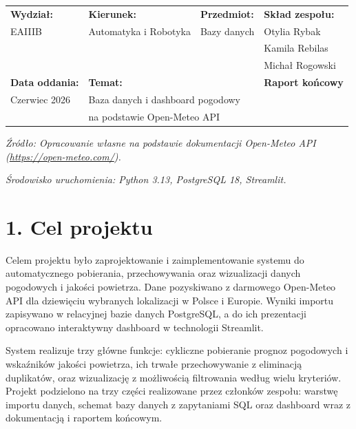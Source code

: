 \documentclass[12pt, a4paper]{article}
\begin{document}

\begin{table}[H]
\centering
\begin{tabular}{|p{3cm}|p{3.5cm}|p{3.5cm}|p{3.5cm}|}
\hline
\textbf{Wydział:} & \textbf{Kierunek:} & \textbf{Przedmiot:} & \textbf{Skład zespołu:} \\
EAIIIB & Automatyka i Robotyka & Bazy danych & Otylia Rybak \\
       &             &             & Kamila Rebilas \\
       &             &             & Michał Rogowski \\
\hline
\textbf{Data oddania:} & \multicolumn{2}{l|}{\textbf{Temat:}} & \textbf{Raport końcowy} \\
Czerwiec 2026 & \multicolumn{2}{l|}{Baza danych i dashboard pogodowy} & \\
              & \multicolumn{2}{l|}{na podstawie Open-Meteo API} & \\
\hline
\end{tabular}
\end{table}

\vspace{0.5cm}

\noindent\textit{Źródło: Opracowanie własne na podstawie dokumentacji Open-Meteo API (\url{https://open-meteo.com/}).}

\noindent\textit{Środowisko uruchomienia: Python 3.13, PostgreSQL 18, Streamlit.}

\vspace{1cm}


\section*{\textbf{1. Cel projektu}}

Celem projektu było zaprojektowanie i zaimplementowanie systemu do automatycznego
pobierania, przechowywania oraz wizualizacji danych pogodowych i jakości powietrza.
Dane pozyskiwano z darmowego Open-Meteo API dla dziewięciu wybranych lokalizacji
w Polsce i Europie. Wyniki importu zapisywano w relacyjnej bazie danych PostgreSQL,
a do ich prezentacji opracowano interaktywny dashboard w technologii Streamlit.

System realizuje trzy główne funkcje: cykliczne pobieranie prognoz pogodowych
i wskaźników jakości powietrza, ich trwałe przechowywanie z eliminacją duplikatów,
oraz wizualizację z możliwością filtrowania według wielu kryteriów. Projekt
podzielono na trzy części realizowane przez członków zespołu: warstwę importu danych,
schemat bazy danych z zapytaniami SQL oraz dashboard wraz z dokumentacją i raportem końcowym.
\end{document}
